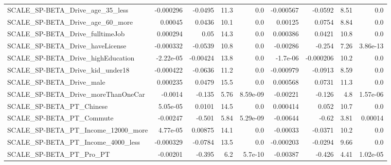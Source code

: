 \begin{tabular}{lrrrrrrrr}
SCALE\_SP-BETA\_Drive\_age\_35\_less                    &   -0.000296 &      -0.0495 &      11.3 &      0.0 &  -0.000567 &     -0.0592 &         8.51 &           0.0 \\
SCALE\_SP-BETA\_Drive\_age\_60\_more                    &     0.00045 &       0.0436 &      10.1 &      0.0 &    0.00125 &      0.0754 &         8.84 &           0.0 \\
SCALE\_SP-BETA\_Drive\_fulltimeJob                    &    0.000294 &         0.05 &      14.3 &      0.0 &   0.000386 &      0.0421 &         10.8 &           0.0 \\
SCALE\_SP-BETA\_Drive\_haveLicense                    &   -0.000332 &      -0.0539 &      10.8 &      0.0 &   -0.00286 &      -0.254 &         7.26 &      3.86e-13 \\
SCALE\_SP-BETA\_Drive\_highEducation                  &   -2.22e-05 &     -0.00424 &      13.8 &      0.0 &   -1.7e-06 &   -0.000206 &         10.2 &           0.0 \\
SCALE\_SP-BETA\_Drive\_kid\_under18                    &   -0.000422 &      -0.0636 &      11.2 &      0.0 &  -0.000979 &     -0.0913 &         8.59 &           0.0 \\
SCALE\_SP-BETA\_Drive\_male                           &    0.000235 &       0.0479 &      15.5 &      0.0 &   0.000568 &      0.0731 &         11.3 &           0.0 \\
SCALE\_SP-BETA\_Drive\_moreThanOneCar                 &     -0.0014 &       -0.135 &      5.76 & 8.59e-09 &   -0.00221 &      -0.126 &          4.8 &      1.57e-06 \\
SCALE\_SP-BETA\_PT\_Chinese                           &    5.05e-05 &       0.0101 &      14.5 &      0.0 &   0.000414 &       0.052 &         10.7 &           0.0 \\
SCALE\_SP-BETA\_PT\_Commute                           &    -0.00247 &       -0.501 &      5.84 & 5.29e-09 &   -0.00644 &       -0.62 &         3.81 &       0.00014 \\
SCALE\_SP-BETA\_PT\_Income\_12000\_more                 &    4.77e-05 &      0.00875 &      14.1 &      0.0 &   -0.00033 &     -0.0371 &         10.2 &           0.0 \\
SCALE\_SP-BETA\_PT\_Income\_4000\_less                  &   -0.000329 &      -0.0784 &      13.5 &      0.0 &  -0.000203 &     -0.0294 &         9.66 &           0.0 \\
SCALE\_SP-BETA\_PT\_Pro\_PT                            &    -0.00201 &       -0.395 &       6.2 &  5.7e-10 &   -0.00387 &      -0.426 &         4.41 &      1.02e-05 \\

\end{tabular}
